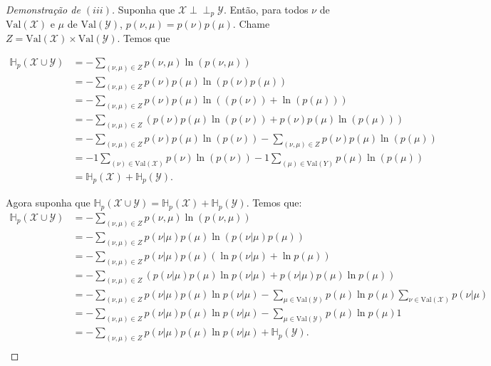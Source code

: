 \documentclass[paper=a4, fontsize=11pt]{scrartcl} %
\numberwithin{equation}{subsection}
\numberwithin{figure}{subsection}
\numberwithin{table}{subsection}
\numberwithin{definition}{subsection}
\numberwithin{theorem}{subsection}
\numberwithin{property}{subsection}
\numberwithin{proposition}{subsection}
\numberwithin{equation}{section}
\numberwithin{figure}{section}
\numberwithin{table}{section}
\numberwithin{definition}{section}
\numberwithin{theorem}{section}
\numberwithin{property}{section}
\numberwithin{proposition}{section}
\def\ind{\perp\!\!\!\perp}
\newcommand{\set}[1]{\mathcal{#1}}
\newcommand{\entp}{\ensuremath{\mathbb{H}_p}\xspace}
\newcommand{\val}{\ensuremath{\text{Val}}\xspace}
\begin{document}
\begin{proof}[Demonstração de $(iii)$]

Suponha que $\set{X} \ind_p \set{Y}$. Então, para todos $\nu$ de $\val(\set{X})$ e $\mu$ de
$\val(\set{Y})$,  $p(\nu, \mu) = p(\nu) p(\mu).$ Chame $Z = \val(\set{X}) \times \val(\set{Y})$. Temos que

\begin{align*}
\entp ( \set{X} \cup \set{Y} )
  &= - \sum_{(\nu, \mu) \in Z} p(\nu, \mu) \ln \left({p(\nu, \mu)} \right)  \\
  &= - \sum_{(\nu, \mu) \in Z} p(\nu) p(\mu) \ln \left({p(\nu) p(\mu)} \right)  \\
  &= - \sum_{(\nu, \mu) \in Z} p(\nu) p(\mu) \ln \left( \left({p(\nu)} \right) + \ln \left({p(\mu)} \right) \right) \\
  &= - \sum_{(\nu, \mu) \in Z} \left( p(\nu) p(\mu) \ln \left({p(\nu)} \right) + p(\nu) p(\mu)  \ln \left({p(\mu)} \right) \right) \\ 
  &= - \sum_{(\nu, \mu) \in Z} p(\nu) p(\mu) \ln \left({p(\nu)} \right) - \sum_{(\nu, \mu) \in Z} p(\nu) p(\mu)  \ln \left({p(\mu)} \right) \\
  &= - 1\sum_{(\nu) \in \val(\set{X})} p(\nu) \ln \left({p(\nu)} \right) - 1\sum_{(\mu) \in \val(Y)} p(\mu)  \ln \left({p(\mu)} \right) \\
  &= \entp ( \set{X} ) + \entp ( \set{Y} ).
\end{align*}


Agora suponha que $\entp ( \set{X} \cup \set{Y} ) = \entp ( \set{X} ) + \entp ( \set{Y} )$. Temos que:
\begin{align*}
\entp ( \set{X} \cup \set{Y} ) 
  &= - \sum_{(\nu, \mu) \in Z} p(\nu, \mu) \ln \left({p(\nu, \mu)} \right)  \\
  &= - \sum_{(\nu, \mu) \in Z} p(\nu | \mu) p(\mu) \ln \left({p(\nu|\mu) p(\mu)} \right) \\
  &= - \sum_{(\nu, \mu) \in Z} p(\nu | \mu) p(\mu) \left( \ln p(\nu|\mu)  + \ln p(\mu) \right) \\
  &= - \sum_{(\nu, \mu) \in Z} \left( p(\nu | \mu) p(\mu) \ln p(\nu|\mu)  + p(\nu | \mu) p(\mu)  \ln p(\mu) \right) \\
  &= - \sum_{(\nu, \mu) \in Z} p(\nu | \mu) p(\mu) \ln p(\nu|\mu)  - \sum_{\mu \in \val(\set{Y})} p(\mu) \ln p(\mu) \sum_{\nu \in \val(\set{X})} p(\nu | \mu)   \\
  &= - \sum_{(\nu, \mu) \in Z} p(\nu | \mu) p(\mu) \ln p(\nu|\mu)  - \sum_{\mu \in \val(\set{Y})} p(\mu) \ln p(\mu) 1 \\
  &= - \sum_{(\nu, \mu) \in Z} p(\nu | \mu) p(\mu) \ln p(\nu|\mu) +  \entp(\set{Y}). \\
\end{align*}


\end{proof}
\end{document}
